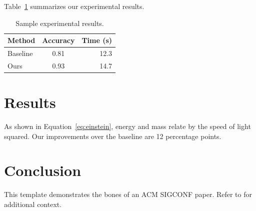 \documentclass[sigconf]{acmart}
\begin{document}
Table~\ref{tab:results} summarizes our experimental results.

\begin{table}[h]
\caption{Sample experimental results.}
\label{tab:results}
\begin{tabular}{lcr}
\toprule
Method & Accuracy & Time (s) \\
\midrule
Baseline & 0.81 & 12.3 \\
Ours     & 0.93 & 14.7 \\
\bottomrule
\end{tabular}
\end{table}

\section{Results}

As shown in Equation~\eqref{eq:einstein}, energy and mass relate by the speed
of light squared. Our improvements over the baseline are 12 percentage points.

\section{Conclusion}

This template demonstrates the bones of an ACM SIGCONF paper. Refer to
\cite{einstein,dirac} for additional context.



\end{document}
